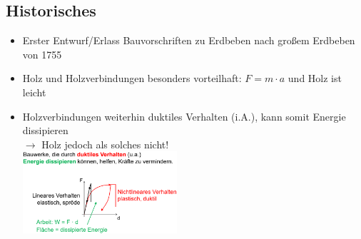 \documentclass[fleqn,twoside]{article}
\begin{document}
    \subsection{Historisches}
        \begin{itemize}
            \item Erster Entwurf/Erlass Bauvorschriften zu Erdbeben nach großem Erdbeben von 1755
            \item Holz und Holzverbindungen besonders vorteilhaft: $F=m\cdot a$ und Holz ist leicht
            \item Holzverbindungen weiterhin duktiles Verhalten (i.A.), kann somit Energie dissipieren 
            \\  $\rightarrow$ Holz jedoch als solches nicht!\\
                \includegraphics[width=0.45\textwidth]{Grafiken/Erdbeben/Dissipation-duktiles Verhalten.png}
            
        \end{itemize}
\end{document}

